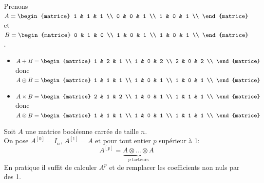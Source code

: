 \begin{exemple}[s]
    
    Prenons $A=\begin{matrice}
            1 & 1 & 1 \\
            0 & 0 & 1 \\
            1 & 0 & 1 \\
        \end{matrice}$ et $B=\begin{matrice}
            0 & 1 & 0 \\
            1 & 0 & 1 \\
            1 & 0 & 1 \\
        \end{matrice}$.
    \begin{itemize}
        \item 	$A+B=\begin{matrice}
                      1 & 2 & 1 \\
                      1 & 0 & 2 \\
                      2 & 0 & 2 \\
                  \end{matrice}$ donc $A\oplus B=\begin{matrice}
                      1 & 1 & 1 \\
                      1 & 0 & 1 \\
                      1 & 0 & 1 \\
                  \end{matrice}$
        \item 	$A\times B =\begin{matrice}
                      2 & 1 & 2 \\
                      1 & 0 & 1 \\
                      1 & 1 & 1 \\
                  \end{matrice}$ donc $A\otimes B=\begin{matrice}
                      1 & 1 & 1 \\
                      1 & 0 & 1 \\
                      1 & 1 & 1 \\
                  \end{matrice}$
    \end{itemize}
\end{exemple}

\begin{definition}
    
    Soit $A$ une matrice booléenne carrée de taille $n$.\\
    On pose $A^{[0]}=I_n$, $A^{[1]}=A$ et pour tout entier $p$ supérieur à 1:
    $$A^{[p]}=\underbrace{A\otimes\ldots \otimes A}_{p\text{\ facteurs}}$$
    En pratique il suffit de calculer $A^p$ et de remplacer les coefficients non nuls par des 1.
\end{definition}

